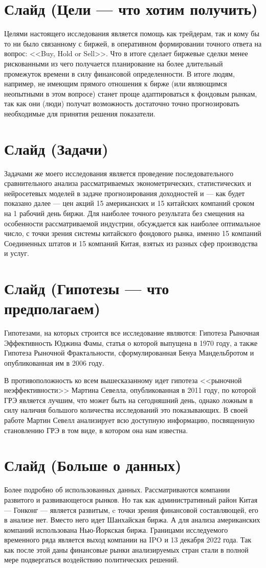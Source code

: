 \documentclass[a4paper, 12pt]{article}
\begin{document}
	\section{Слайд (Цели --- что хотим получить)}
		Целями настоящего исследования является помощь как трейдерам, так и кому бы то ни было связанному с биржей, в оперативном формировании точного ответа на вопрос: <<Buy, Hold or Sell>>. Что в итоге сделает биржевые сделки менее рискованными из чего получается планирование на более длительный промежуток времени в силу финансовой определенности. В итоге людям, например, не имеющим прямого отношения к бирже (или являющимся неопытными в этом вопросе) станет проще адаптироваться к фондовым рынкам, так как они (люди) получат возможность достаточно точно прогнозировать необходимые для принятия решения показатели.
	\section{Слайд (Задачи)}
		Задачами же моего исследования является проведение последовательного сравнительного анализа рассматриваемых эконометрических, статистических и нейросетевых моделей в задаче прогнозирования доходностей и --- как будет показано далее --- цен акций 15 американских и 15 китайских компаний сроком на 1 рабочий день биржи. Для наиболее точного результата без смещения на особенности рассматриваемой индустрии, обсуждается как наиболее оптимальное число, с точки зрения системы китайского фондового рынка, именно 15 компаний Соединенных штатов и 15 компаний Китая, взятых из разных сфер производства и услуг.
	\section{Слайд (Гипотезы --- что предполагаем)}
		Гипотезами, на которых строится все исследование являются: Гипотеза Рыночная Эффективность Юджина Фамы, статья о которой выпущена в 1970 году, а также Гипотеза Рыночной Фрактальности, сформулированная Бенуа Мандельбротом и опубликованная им в 2006 году.
		
		В противоположность ко всем вышесказанному идет гипотеза <<рыночной неэффективности>> Мартина Севелла, опубликованная в 2011 году, по которой ГРЭ является лучшим, что может быть на сегодняшний день, однако ложным в силу наличия большого количества исследований это показывающих. В своей работе Мартин Севелл анализирует всю доступную информацию, посвященную становлению ГРЭ в том виде, в котором она нам известна.
	\section{Слайд (Больше о данных)}
		Более подробно об использованных данных. Рассматриваются компании развитого и развивающегося рынков. Но так как административный район Китая --- Гонконг --- является развитым, c точки зрения финансовой составляющей, его в анализе нет. Вместо него идет Шанхайская биржа. А для анализа американских компаний использована Нью-Йоркская биржа. Границами исследуемого временного ряда является выход компании на IPO и 13 декабря 2022 года. Так как после этой даны финансовые рынки анализируемых стран стали в полной мере подвергаться воздействию политических решений.
		
\end{document}
